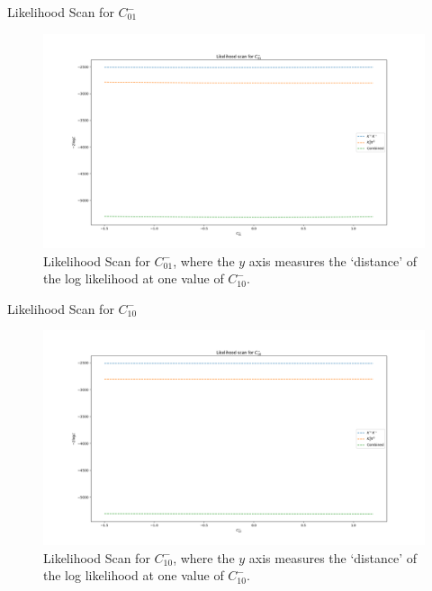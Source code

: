 \begin{frame}{Likelihood Scan for $C_{01}^{-}$}
\begin{figure}
    \centering
        \includegraphics[width=\textwidth]{2020_04_23/figs/M01.png}
    \caption{Likelihood Scan for $C_{01}^{-}$, where the $y$ axis measures the `distance' of the log likelihood at one value of $C_{10}^{-}$.}
    \label{fig:scanCM01}
\end{figure}
\end{frame}

\begin{frame}{Likelihood Scan for $C_{10}^{-}$}
\begin{figure}
    \centering
        \includegraphics[width=\textwidth]{2020_04_23/figs/M10.png}
    \caption{Likelihood Scan for $C_{10}^{-}$, where the $y$ axis measures the `distance' of the log likelihood at one value of $C_{10}^{-}$.}
    \label{fig:scanCM10}
\end{figure}
\end{frame}

